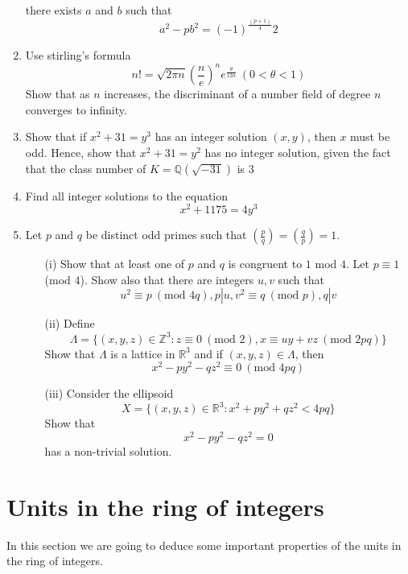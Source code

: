 \begin{enumerate}
there exists $a$ and $b$ such that
$$a^2-pb^2=(-1)^{\frac{(p+1)}{4}} 2$$
\item Use stirling's formula
$$n!=\sqrt{2\pi n}\left(\frac{n}{e}\right)^n e^{\frac{\theta}{12n}}~(0 <\theta<1)$$
Show that as $n$ increases, the discriminant of a number field of degree $n$ converges to infinity.
\item Show that if $x^2+31=y^3$ has an integer solution $(x,y)$, then $x$ must be odd. Hence, show that
$x^2+31=y^2$ has no integer solution, given the fact that the class number of $K=\mathbb{Q}(\sqrt{-31})$ is $3$
\item Find all integer solutions to the equation
$$x^2+1175=4y^3$$
\item Let $p$ and $q$ be distinct odd primes such that $(\frac{p}{q})=(\frac{q}{p})=1$.
\begin{enumerate}
\item[(i)] Show that at least one of $p$ and $q$ is congruent to $1$ mod $4$. Let $p \equiv 1$ (mod $4$). Show also that there are integers $u,v$ such that
    $$u^2 \equiv p~(\text{mod } 4q),p|u, v^2 \equiv q~(\text{mod }p),q|v$$
\item[(ii)] Define
$$\Lambda=\{(x,y,z)\in \mathbb{Z}^3: z \equiv 0~(\text{mod }2),x \equiv uy+vz~(\text{mod }2pq)\}$$
Show that $\Lambda$ is a lattice in $\mathbb{R}^3$ and if $(x,y,z) \in \Lambda$, then
$$x^2-py^2-qz^2 \equiv 0~(\text{mod }4pq)$$
\item[(iii)] Consider the ellipsoid
$$X=\{(x,y,z)\in \mathbb{R}^3: x^2+py^2+qz^2 < 4pq\}$$
Show that
$$x^2-py^2-qz^2=0$$
has a non-trivial solution.
\end{enumerate}
\end{enumerate}








\section{Units in the ring of integers}
In this section we are going to deduce some important properties of the units in the ring of integers.
